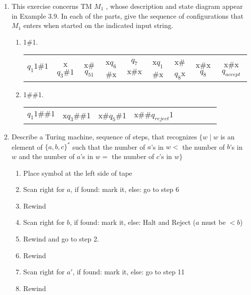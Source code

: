 \documentclass{article}
\begin{document}
\begin{enumerate}
\begin{enumerate}[label = (\alph*) ]
        \end{enumerate}
        \item  This exercise concerns TM $M_1$ , whose description and state diagram appear in 
        Example 3.9. In each of the parts, give the sequence of configurations that $M_1$ 
        enters when started on the indicated input string.
        \begin{enumerate}[label = (\alph*) ]
            \item 1\#1.\newline
            \begin{tabular}{c c c c c c c c c}
                $q_1 1\#1$\textvisiblespace & x$q_3\#1$\textvisiblespace & x\#$q_51$\textvisiblespace
                & x$q_6$\#x\textvisiblespace & $q_7$x\#x\textvisiblespace & x$q_1$\#x\textvisiblespace 
                & x\#$q_8$x\textvisiblespace & x\#x$q_8$\textvisiblespace & x\#x\textvisiblespace$q_{accept}$
            \end{tabular}
            \item 1\#\#1.\newline
            \begin{tabular}{c c c c c c c c c}
                $q_1 1\#\#1$\textvisiblespace & x$q_3$\#\#1\textvisiblespace 
                & x\#$q_5$\#1\textvisiblespace & x\#\#$q_{reject}$1\textvisiblespace
            \end{tabular}
        \end{enumerate}
        \item Describe a Turing machine, sequence of steps, that recognizes 
        $\{ w \mid w $ is an element of $ \{a, b, c\}^* $ such that the number of $a$'s in $w <$ 
        the number of $b$'s in $w$ and the number of $a$'s in $w =$ the number of $c$'s in $w \}$
        \begin{enumerate}[label = (\arabic*)]
            \item Place symbol at the left side of tape
            \item Scan right for $a$, if found: mark it, else: go to step 6
            \item Rewind
            \item Scan right for $b$, if found: mark it, else: Halt and Reject ($a$ must be $< b$)
            \item Rewind and go to step 2.
            \item Rewind
            \item Scan right for $a'$, if found: mark it, else: go to step 11
            \item Rewind

\end{enumerate}
\end{enumerate}
\end{document}
